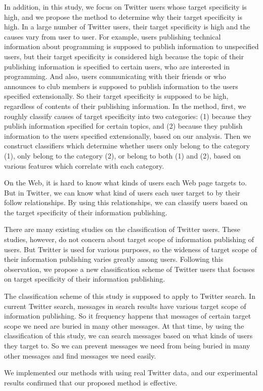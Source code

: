 \begin{eabstract}
In addition, in this study, we focus on Twitter users whose target
 specificity is high, and we propose the method to determine why their
 target specificity is high.  In a large number of Twitter users, their
 target specificity is high and the causes vary from user to user.  For
 example, users publishing technical information about programming is
 supposed to publish information to unspecified users, but their
 target specificity is considered high because the topic of their
 publishing information is specified to certain users, who are
 interested in programming. And also, users communicating with their
 friends or who announces to club members is supposed to publish
 information to the users specified extensionally. So their target
 specificity is supposed to be high, regardless of contents of their
 publishing information.  In the method, first, we roughly classify
 causes of target specificity into two categories: (1) because they
 publish information specified for certain topics, and (2) because they
 publish information to the users specified extensionally, based on our
 analysis.  Then we construct classifiers which determine whether users
 only belong to the category (1), only belong to the category (2), or
 belong to both (1) and (2), based on various features which correlate
 with each category.

On the Web, it is hard to know what kinds of users each Web page targets
 to.  But in Twitter, we can know what kind of users each user target to
 by their follow relationships.  By using this relationships, we can
 classify users based on the target specificity of their information
 publishing.

There are many existing studies on the classification of Twitter
 users. These studies, however, do not concern about target scope of
 information publishing of users. But Twitter is used for various
 purposes, so the wideness of target scope of their information
 publishing varies greatly among users.  Following this observation, we
 propose a new classification scheme of Twitter users that focuses on
 target specificity of their information publishing.

The classification scheme of this study is supposed to apply to Twitter
 search.  In current Twitter search, messages in search results have
 various target scope of information publishing.  So it frequency
 happens that messages of certain target scope we need are buried in
 many other messages.  At that time, by using the classification of this
 study, we can search messages based on what kinds of users they target
 to.  So we can prevent messages we need from being buried in many other
 messages and find messages we need easily.

We implemented our methods with using real Twitter data, and our
 experimental results confirmed that our proposed method is effective.

\end{eabstract}

